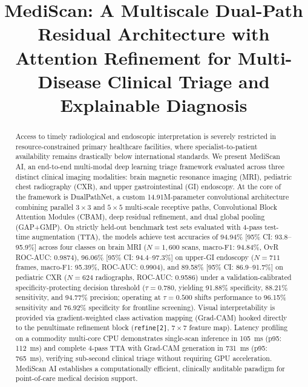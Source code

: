 \documentclass[conference]{IEEEtran}
\begin{document}
\title{MediScan: A Multiscale Dual-Path Residual Architecture with Attention Refinement for Multi-Disease Clinical Triage and Explainable Diagnosis}

\author{
}

\maketitle

\begin{abstract}
Access to timely radiological and endoscopic interpretation is severely restricted in resource-constrained primary healthcare facilities, where specialist-to-patient availability remains drastically below international standards. We present MediScan AI, an end-to-end multi-modal deep learning triage framework evaluated across three distinct clinical imaging modalities: brain magnetic resonance imaging (MRI), pediatric chest radiography (CXR), and upper gastrointestinal (GI) endoscopy. At the core of the framework is DualPathNet, a custom 14.91M-parameter convolutional architecture combining parallel $3\times 3$ and $5\times 5$ multi-scale receptive paths, Convolutional Block Attention Modules (CBAM), deep residual refinement, and dual global pooling (GAP+GMP). On strictly held-out benchmark test sets evaluated with 4-pass test-time augmentation (TTA), the models achieve test accuracies of 94.94\% [95\% CI: 93.8--95.9\%] across four classes on brain MRI ($N=1{,}600$ scans, macro-F1: 94.84\%, OvR ROC-AUC: 0.9874), 96.06\% [95\% CI: 94.4--97.3\%] on upper-GI endoscopy ($N=711$ frames, macro-F1: 95.39\%, ROC-AUC: 0.9904), and 89.58\% [95\% CI: 86.9--91.7\%] on pediatric CXR ($N=624$ radiographs, ROC-AUC: 0.9586) under a validation-calibrated specificity-protecting decision threshold ($\tau=0.780$, yielding 91.88\% specificity, 88.21\% sensitivity, and 94.77\% precision; operating at $\tau=0.500$ shifts performance to 96.15\% sensitivity and 76.92\% specificity for frontline screening). Visual interpretability is provided via gradient-weighted class activation mapping (Grad-CAM) hooked directly to the penultimate refinement block (\texttt{refine[2]}, $7\times 7$ feature map). Latency profiling on a commodity multi-core CPU demonstrates single-scan inference in 105~ms (p95: 112~ms) and complete 4-pass TTA with Grad-CAM generation in 731~ms (p95: 765~ms), verifying sub-second clinical triage without requiring GPU acceleration. MediScan AI establishes a computationally efficient, clinically auditable paradigm for point-of-care medical decision support.
\end{abstract}
\end{document}
